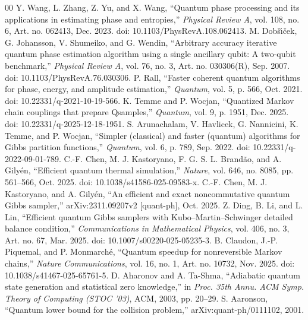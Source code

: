 \documentclass[10pt,conference]{IEEEtran}
\providecommand{\href}[2]{#2}
\theoremstyle{plain}
\theoremstyle{remark}
\begin{document}
\begin{thebibliography}{00}
 Y. Wang, L. Zhang, Z. Yu, and X. Wang, ``Quantum phase processing and its applications in estimating phase and entropies,'' \emph{Physical Review A}, vol. 108, no. 6, Art. no. 062413, Dec. 2023. doi: \href{https://doi.org/10.1103/PhysRevA.108.062413}{10.1103/PhysRevA.108.062413}.
 M. Dob\v{s}\'{\i}\v{c}ek, G. Johansson, V. Shumeiko, and G. Wendin, ``Arbitrary accuracy iterative quantum phase estimation algorithm using a single ancillary qubit: A two-qubit benchmark,'' \emph{Physical Review A}, vol. 76, no. 3, Art. no. 030306(R), Sep. 2007. doi: \href{https://doi.org/10.1103/PhysRevA.76.030306}{10.1103/PhysRevA.76.030306}.
 P. Rall, ``Faster coherent quantum algorithms for phase, energy, and amplitude estimation,'' \emph{Quantum}, vol. 5, p. 566, Oct. 2021. doi: \href{https://doi.org/10.22331/q-2021-10-19-566}{10.22331/q-2021-10-19-566}.
 K. Temme and P. Wocjan, ``Quantized Markov chain couplings that prepare Qsamples,'' \emph{Quantum}, vol. 9, p. 1951, Dec. 2025. doi: \href{https://doi.org/10.22331/q-2025-12-18-1951}{10.22331/q-2025-12-18-1951}.
 S. Arunachalam, V. Havlicek, G. Nannicini, K. Temme, and P. Wocjan, ``Simpler (classical) and faster (quantum) algorithms for Gibbs partition functions,'' \emph{Quantum}, vol. 6, p. 789, Sep. 2022. doi: \href{https://doi.org/10.22331/q-2022-09-01-789}{10.22331/q-2022-09-01-789}.
 C.-F. Chen, M. J. Kastoryano, F. G. S. L. Brand\~ao, and A. Gily\'en, ``Efficient quantum thermal simulation,'' \emph{Nature}, vol. 646, no. 8085, pp. 561--566, Oct. 2025. doi: \href{https://doi.org/10.1038/s41586-025-09583-x}{10.1038/s41586-025-09583-x}.
 C.-F. Chen, M. J. Kastoryano, and A. Gily\'en, ``An efficient and exact noncommutative quantum Gibbs sampler,'' arXiv:\href{https://arxiv.org/abs/2311.09207v2}{2311.09207v2} [quant-ph], Oct. 2025.
 Z. Ding, B. Li, and L. Lin, ``Efficient quantum Gibbs samplers with Kubo--Martin--Schwinger detailed balance condition,'' \emph{Communications in Mathematical Physics}, vol. 406, no. 3, Art. no. 67, Mar. 2025. doi: \href{https://doi.org/10.1007/s00220-025-05235-3}{10.1007/s00220-025-05235-3}.
 B. Claudon, J.-P. Piquemal, and P. Monmarch\'{e}, ``Quantum speedup for nonreversible Markov chains,'' \emph{Nature Communications}, vol. 16, no. 1, Art. no. 10732, Nov. 2025. doi: \href{https://doi.org/10.1038/s41467-025-65761-5}{10.1038/s41467-025-65761-5}.
 D. Aharonov and A. Ta-Shma, ``Adiabatic quantum state generation and statistical zero knowledge,'' in \emph{Proc. 35th Annu. ACM Symp. Theory of Computing (STOC '03)}, ACM, 2003, pp. 20--29.
 S. Aaronson, ``Quantum lower bound for the collision problem,'' arXiv:\href{https://arxiv.org/abs/quant-ph/0111102}{quant-ph/0111102}, 2001.
\end{thebibliography}
\end{document}
